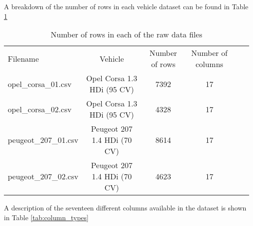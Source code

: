 \documentclass[a4paper,11pt]{article}
\begin{document}
A breakdown of the number of rows in each vehicle dataset can be found in Table \ref{tab:file_rows}

\begin{table}[!ht]
	\caption{Number of rows in each of the raw data files}\label{tab:file_rows}
	\centering
	\begin{tabular}{lccccc}\toprule
		Filename & Vehicle & Number of rows & Number of columns \\ 
		opel\_corsa\_01.csv & Opel Corsa 1.3 HDi (95 CV) & 7392 & 17 \\ 
		opel\_corsa\_02.csv & Opel Corsa 1.3 HDi (95 CV) & 4328 & 17 \\ 
		peugeot\_207\_01.csv & Peugeot 207 1.4 HDi (70 CV) & 8614 & 17 \\ 
		peugeot\_207\_02.csv & Peugeot 207 1.4 HDi (70 CV) & 4623 & 17 \\ \bottomrule
	\end{tabular}
\end{table}

A description of the seventeen different columns available in the dataset is shown in Table \ref{tab:column_types}
\end{document}
